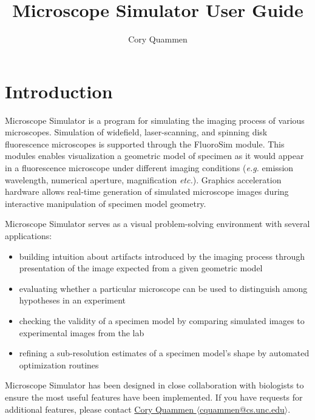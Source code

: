 \documentclass[11pt,titlepage,twoside]{article}
\title{Microscope Simulator \ProgramVersion User Guide}
\author{Cory Quammen}
\begin{document}
\maketitle
\tableofcontents
\vfill

\pagebreak

\section{Introduction}

Microscope Simulator \ProgramVersion is a program for simulating the imaging process of various microscopes. Simulation of widefield, laser-scanning, and spinning disk fluorescence microscopes is supported through the FluoroSim module. This modules enables visualization  a geometric model of specimen as it would appear in a fluorescence microscope under different imaging conditions (\emph{e.g.} emission wavelength, numerical aperture, magnification \emph{etc.}). Graphics acceleration hardware allows real-time generation of simulated microscope images during interactive manipulation of specimen model geometry.

Microscope Simulator \ProgramVersion serves as a visual problem-solving environment with several applications:

\begin{itemize}

\item building intuition about artifacts introduced by the imaging process through presentation of the image expected from a given geometric model

\item evaluating whether a particular microscope can be used to distinguish among hypotheses in an experiment

\item checking the validity of a specimen model by comparing simulated images to experimental images from the lab

\item refining a sub-resolution estimates of a specimen model's shape by automated optimization routines

\end{itemize}

Microscope Simulator \ProgramVersion has been designed in close collaboration with biologists to ensure the most useful features have been implemented. If you have requests for additional features, please contact  \href{mailto:cquammen@cs.unc.edu}{Cory Quammen $\langle$cquammen@cs.unc.edu$\rangle$}.
\end{document}
